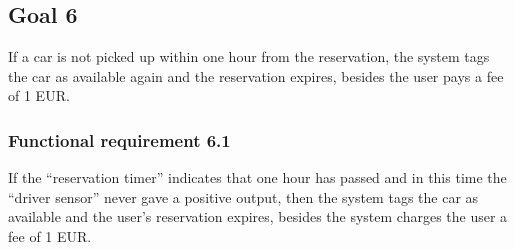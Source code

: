 \subsection{Goal 6}
If a car is not picked up within one hour from the reservation, the system tags the car as available again and the reservation expires, besides the user pays a fee of 1 EUR.

\setcounter{secnumdepth}{3}
\subsubsection{Functional requirement 6.1}
If the “reservation timer” indicates that one hour has passed and in this time the “driver sensor” never gave a positive output, then the system tags the car as available and the user’s reservation expires, besides the system charges the user a fee of 1 EUR.